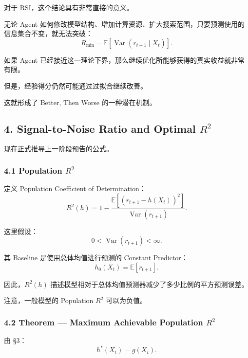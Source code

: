 对于 RSI，这个结论具有非常直接的意义。

无论 Agent 如何修改模型结构、增加计算资源、扩大搜索范围，只要预测使用的信息集合不变，就无法突破：
\[\boxed{
R_{\min}
=
\mathbb E[
\operatorname{Var}(r_{t+1}\mid X_t)
].
}\]

如果 Agent 已经接近这一理论下界，那么继续优化所能够获得的真实收益就非常有限。

但是，经验得分仍然可能通过过拟合继续改善。

这就形成了 Better, Then Worse 的一种潜在机制。

\hypertarget{part-4-60-0001-signal-to-noise-ratio-and-optimal-r2}{%
\subsection{\texorpdfstring{4. Signal-to-Noise Ratio and Optimal \(R^2\)}{4. Signal-to-Noise Ratio and Optimal R\^{}2}}\label{part-4-60-0001-signal-to-noise-ratio-and-optimal-r2}}

现在正式推导上一阶段预告的公式。

\hypertarget{part-4-60-0001-population-r2}{%
\subsubsection{\texorpdfstring{4.1 Population \(R^2\)}{4.1 Population R\^{}2}}\label{part-4-60-0001-population-r2}}

定义 Population Coefficient of Determination：
\[R^2(h)
=
1-
\frac{
\mathbb E[(r_{t+1}-h(X_t))^2]
}{
\operatorname{Var}(r_{t+1})
}.\]

这里假设：
\[0<\operatorname{Var}(r_{t+1})<\infty.\]

其 Baseline 是使用总体均值进行预测的 Constant Predictor：
\[h_0(X_t)=\mathbb E[r_{t+1}].\]

因此，\(R^2(h)\) 描述模型相对于总体均值预测器减少了多少比例的平方预测误差。

注意，一般模型的 Population \(R^2\) 可以为负值。

\hypertarget{part-4-60-0001-theorem-maximum-achievable-population-r2}{%
\subsubsection{\texorpdfstring{4.2 Theorem --- Maximum Achievable Population \(R^2\)}{4.2 Theorem --- Maximum Achievable Population R\^{}2}}\label{part-4-60-0001-theorem-maximum-achievable-population-r2}}

由 §3：
\[h^*(X_t)=g(X_t).\]

